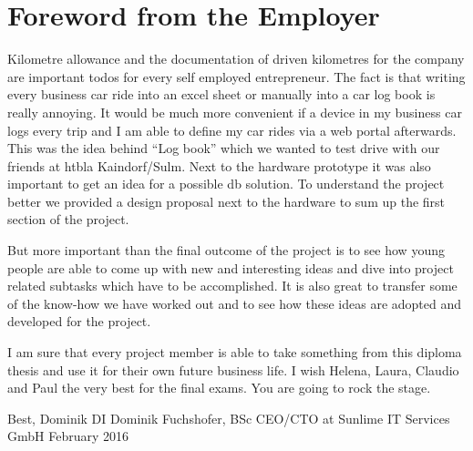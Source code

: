 \chapter*{Foreword from the Employer}
Kilometre allowance and the documentation of driven kilometres for the company are important todos for every self employed entrepreneur. The fact is that writing every business car ride into an excel sheet or manually into a car log book is really annoying. It would be much more convenient if a device in my business car logs every trip and I am able to define my car rides via a web portal afterwards. This was the idea behind “Log book” which we wanted to test drive with our friends at \gls{htbla} Kaindorf/Sulm. Next to the hardware prototype it was also important to get an idea for a possible \gls{db} solution. To understand the project better we provided a design proposal next to the hardware to sum up the first section of the project.

But more important than the final outcome of the project is to see how young people are able to come up with new and interesting ideas and dive into project related subtasks which have to be accomplished. It is also great to transfer some of the know-how we have worked out and to see how these ideas are adopted and developed for the project.

I am sure that every project member is able to take something from this diploma thesis and use it for their own future business life. I wish Helena, Laura, Claudio and Paul the very best for the final exams. You are going to rock the stage.

  Best,\newline
Dominik\newline\newline
DI Dominik Fuchshofer, BSc\newline
CEO/CTO at Sunlime IT Services GmbH\newline
February 2016
